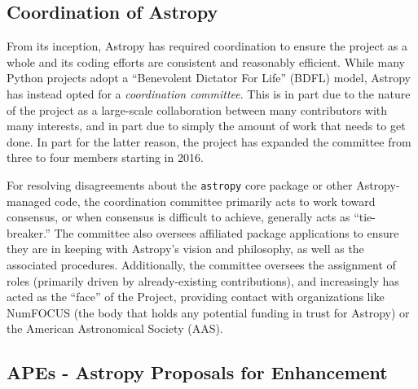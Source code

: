 \documentclass[modern]{aastex61}
\newcommand{\package}[1]{\texttt{#1}\xspace}
\newcommand{\astropy}{Astropy\xspace}
\newcommand{\astropypkg}{\package{astropy}}
\begin{document}
\subsection{Coordination of Astropy}

From its inception, \astropy has required coordination to ensure the project as a whole and its coding efforts are consistent and reasonably efficient.
While many Python projects adopt a ``Benevolent Dictator For Life'' (BDFL) model, \astropy has instead opted for a \emph{coordination committee}.
This is in part due to the nature of the project as a large-scale collaboration between many contributors with many interests, and in part due to simply the amount of work that needs to get done.
In part for the latter reason, the project has expanded the committee from three to four members starting in 2016.

For resolving disagreements about the \astropypkg core package or other \astropy-managed code, the coordination committee primarily acts to work toward consensus, or when consensus is difficult to achieve, generally acts as ``tie-breaker.''
The committee also oversees affiliated package applications to ensure they are in keeping with \astropy's vision and philosophy, as well as the associated procedures.
Additionally, the committee oversees the assignment of roles (primarily driven by already-existing contributions), and increasingly has acted as the ``face'' of the Project, providing contact with organizations like NumFOCUS (the body that holds any potential funding in trust for \astropy) or the American Astronomical Society (AAS).


\subsection{APEs - Astropy Proposals for Enhancement}
\end{document}
